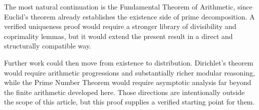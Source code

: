 The most natural continuation is the Fundamental Theorem of Arithmetic,
since Euclid's theorem already establishes the existence side of prime
decomposition. A verified uniqueness proof would require a stronger
library of divisibility and coprimality lemmas, but it would extend the
present result in a direct and structurally compatible way.

Further work could then move from existence to distribution. Dirichlet's
theorem would require arithmetic progressions and substantially richer
modular reasoning, while the Prime Number Theorem would require asymptotic
analysis far beyond the finite arithmetic developed here. Those
directions are intentionally outside the scope of this article, but this
proof supplies a verified starting point for them.
